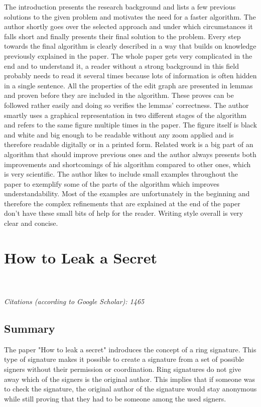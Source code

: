 \documentclass{scrartcl}
\begin{document}
The introduction presents the research background and lists a few
previous solutions to the given problem and motivates the need for a
faster algorithm. The author shortly goes over the selected approach and
under which circumstances it falls short and finally presents their
final solution to the problem. Every step towards the final algorithm is
clearly described in a way that builds on knowledge previously explained
in the paper. The whole paper gets very complicated in the end and to
understand it, a reader without a strong background in this field probably
needs to read it several times because lots of information is often
hidden in a single sentence. All the properties of the edit graph are
presented in lemmas and proven before they are included in the
algorithm. These proves can be followed rather easily and doing so
verifies the lemmas' correctness. The author smartly uses a graphical
representation in two different stages of the algorithm and refers to
the same figure multiple times in the paper. The figure itself is black
and white and big enough to be readable without any zoom applied and is
therefore readable digitally or in a printed form. Related work is a big
part of an algorithm that should improve previous ones and the author
always presents both improvements and shortcomings of his algorithm
compared to other ones, which is very scientific. The author likes to
include small examples throughout the paper to exemplify some of the
parts of the algorithm which improves understandability. Most of the
examples are unfortunately in the beginning and therefore the complex
refinements that are explained at the end of the paper don't have these
small bits of help for the reader. 
Writing style overall is very clear
and concise.

\section{How to Leak a Secret}
\\\\
\emph{Citations (according to Google Scholar): 1465}
\subsection{Summary}
The paper "How to leak a secret" \cite{rivest2001leak} indroduces the concept of a ring signature. This type of signature makes it possible to create a signature from a set of possible signers without their permission or coordination. Ring signatures do not give away which of the signers is the original author.  This implies that if someone was to check the signature, the original author of the signature would stay anonymous while still proving that they had to be someone among the used signers. %
\end{document}
